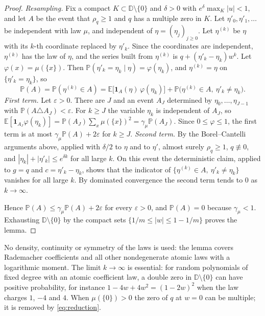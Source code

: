 \documentclass[11pt]{amsart}
\theoremstyle{definition}
\theoremstyle{remark}
\numberwithin{equation}{section}
\newcommand{\D}{\mathbb{D}}
\newcommand{\E}{\mathbb{E}}
\newcommand{\PP}{\mathbb{P}}
\newcommand{\eps}{\varepsilon}
\begin{document}
\begin{proof}
\emph{Resampling.} Fix a compact $K\subset\D\setminus\{0\}$ and $\delta>0$ with $e^\delta\max_K|u|<1$, and let $A$ be the event that $\rho_q\ge1$ and $q$ has a multiple zero in $K$. Let $\eta'_0,\eta'_1,\dots$ be independent with law $\mu$, and independent of $\eta=(\eta_j)_{j\ge0}$. Let $\eta^{(k)}$ be $\eta$ with its $k$-th coordinate replaced by $\eta'_k$. Since the coordinates are independent, $\eta^{(k)}$ has the law of $\eta$, and the series built from $\eta^{(k)}$ is $q+(\eta'_k-\eta_k)w^k$. Let $\varphi(x)=\mu(\{x\})$. Then $\PP(\eta'_k=\eta_k\mid\eta)=\varphi(\eta_k)$, and $\eta^{(k)}=\eta$ on $\{\eta'_k=\eta_k\}$, so
\begin{equation}\label{eq:resample}
\PP(A)=\PP(\eta^{(k)}\in A)=\E\bigl[\mathbf 1_A(\eta)\,\varphi(\eta_k)\bigr]+\PP\bigl(\eta^{(k)}\in A,\ \eta'_k\ne\eta_k\bigr).
\end{equation}
\emph{First term.} Let $\eps>0$. There are $J$ and an event $A_J$ determined by $\eta_0,\dots,\eta_{J-1}$ with $\PP(A\triangle A_J)<\eps$. For $k\ge J$ the variable $\eta_k$ is independent of $A_J$, so $\E[\mathbf 1_{A_J}\varphi(\eta_k)]=\PP(A_J)\sum_x\mu(\{x\})^2=\gamma_\mu\PP(A_J)$. Since $0\le\varphi\le1$, the first term is at most $\gamma_\mu\PP(A)+2\eps$ for $k\ge J$.
\emph{Second term.} By the Borel--Cantelli arguments above, applied with $\delta/2$ to $\eta$ and to $\eta'$, almost surely $\rho_q\ge1$, $q\not\equiv0$, and $|\eta_k|+|\eta'_k|\le e^{\delta k}$ for all large $k$. On this event the deterministic claim, applied to $g=q$ and $c=\eta'_k-\eta_k$, shows that the indicator of $\{\eta^{(k)}\in A,\ \eta'_k\ne\eta_k\}$ vanishes for all large $k$. By dominated convergence the second term tends to $0$ as $k\to\infty$.

Hence $\PP(A)\le\gamma_\mu\PP(A)+2\eps$ for every $\eps>0$, and $\PP(A)=0$ because $\gamma_\mu<1$. Exhausting $\D\setminus\{0\}$ by the compact sets $\{1/m\le|w|\le1-1/m\}$ proves the lemma.
\end{proof}

No density, continuity or symmetry of the laws is used: the lemma covers Rademacher coefficients and all other nondegenerate atomic laws with a logarithmic moment. The limit $k\to\infty$ is essential: for random polynomials of fixed degree with an atomic coefficient law, a double zero in $\D\setminus\{0\}$ can have positive probability, for instance $1-4w+4w^2=(1-2w)^2$ when the law charges $1$, $-4$ and $4$. When $\mu(\{0\})>0$ the zero of $q$ at $w=0$ can be multiple; it is removed by \eqref{eq:reduction}.
\end{document}
